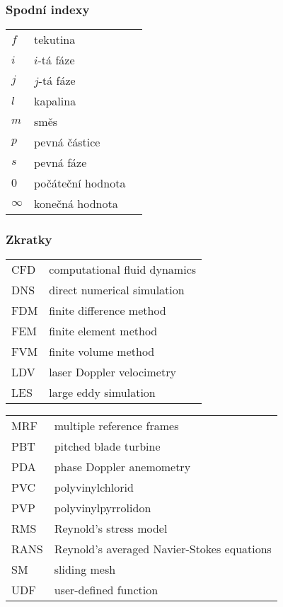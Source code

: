 \subsubsection*{Spodní indexy}
\begin{tabularx}{\textwidth}{@{}p{2.5cm} X r@{}}

$f$ & tekutina & \\
$i$ & $i$-tá fáze & \\
$j$ & $j$-tá fáze & \\
$l$ & kapalina & \\
$m$ & směs & \\
$p$ & pevná částice & \\
$s$ & pevná fáze & \\
$0$ & počáteční hodnota & \\
$\infty$ & konečná hodnota & \\
\end{tabularx}

\subsubsection*{Zkratky}
\begin{tabularx}{\textwidth}{@{}p{2.5cm} X }
	
CFD & computational fluid dynamics  \\
DNS & direct numerical simulation \\
FDM & finite difference method  \\
FEM & finite element method  \\
FVM & finite volume method  \\
LDV & laser Doppler velocimetry  \\
LES & large eddy simulation \\
\end{tabularx}
\begin{tabularx}{\textwidth}{@{}p{2.5cm} X }
MRF & multiple reference frames \\
PBT & pitched blade turbine \\
PDA & phase Doppler anemometry \\
PVC & polyvinylchlorid \\
PVP & polyvinylpyrrolidon \\
RMS & Reynold's stress model\\
RANS & Reynold's averaged Navier-Stokes equations \\
SM & sliding mesh \\
UDF & user-defined function \\
\end{tabularx}

